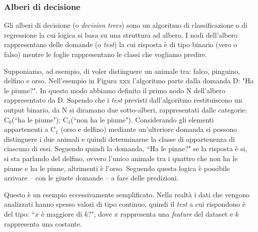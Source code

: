 \documentclass[12pt,italian]{report}
\begin{document}

\subsubsection{Alberi di decisione}

Gli alberi di decisione (o \emph{decision trees}) sono un algoritmo di classificazione o di regressione la cui logica si basa su una struttura ad albero. I nodi dell'albero rappresentano delle domande (o \emph{test}) la cui risposta è di tipo binario (vero o falso) mentre le foglie rappresentano le classi che vogliamo predire.

Supponiamo, ad esempio, di voler distinguere un animale tra: falco, pinguino, delfino e orso. Nell'esempio in Figura xxx l'algoritmo parte dalla domanda D: "Ha le piume?". In questo modo abbiamo definito il primo nodo N dell'albero rappresentato da D. Sapendo che i \emph{test} previsti dall'algoritmo restituiscono un output binario, da N si diramano due sotto-alberi, rappresentati dalle categorie: $ \mathrm{C_0} $(``ha le piume"); $ \mathrm{C_1} $(``non ha le piume"). Considerando gli elementi appartenenti a $ \mathrm{C_1} $ (orso e delfino) mediante un'ulteriore domanda si possono distinguere i due animali e quindi determinarne la classe di appartenenza di ciascuno di essi. Seguendo quindi la domanda, ``Ha le pinne?" se la risposta è si, si sta parlando del delfino, ovvero l'unico animale tra i quattro che non ha le piume e ha le pinne, altrimenti è l'orso. Seguendo questa logica è possibile arrivare -- con le giuste domande -- a fare delle predizioni.

Questo è un esempio eccessivamente semplificato. Nella realtà i dati che vengono analizzati hanno spesso valori di tipo continuo, quindi il \emph{test} a cui rispondono è del tipo: ``$ x $ è maggiore di $ k $?", dove $x$  rappresenta una \emph{feature} del dataset e $k$ rappresenta una costante.
\end{document}
